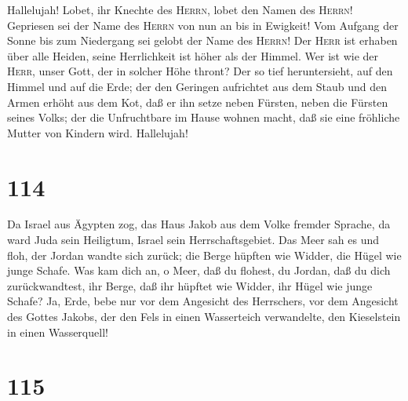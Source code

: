  Hallelujah! Lobet, ihr Knechte des \textsc{Herrn}, lobet
den Namen des \textsc{Herrn}!  Gepriesen sei der Name des
\textsc{Herrn} von nun an bis in Ewigkeit!  Vom Aufgang
der Sonne bis zum Niedergang sei gelobt der Name des \textsc{Herrn}!
 Der \textsc{Herr} ist erhaben über alle Heiden, seine
Herrlichkeit ist höher als der Himmel.  Wer ist wie der
\textsc{Herr}, unser Gott, der in solcher Höhe thront? 
Der so tief heruntersieht, auf den Himmel und auf die Erde;
 der den Geringen aufrichtet aus dem Staub und den Armen
erhöht aus dem Kot,  daß er ihn setze neben Fürsten, neben
die Fürsten seines Volks;  der die Unfruchtbare im Hause
wohnen macht, daß sie eine fröhliche Mutter von Kindern wird.
Hallelujah!

\hypertarget{section-113}{%
\section{114}\label{section-113}}

 Da Israel aus Ägypten zog, das Haus Jakob aus dem Volke
fremder Sprache,  da ward Juda sein Heiligtum, Israel sein
Herrschaftsgebiet.  Das Meer sah es und floh, der Jordan
wandte sich zurück;  die Berge hüpften wie Widder, die
Hügel wie junge Schafe.  Was kam dich an, o Meer, daß du
flohest, du Jordan, daß du dich zurückwandtest,  ihr
Berge, daß ihr hüpftet wie Widder, ihr Hügel wie junge Schafe?
 Ja, Erde, bebe nur vor dem Angesicht des Herrschers, vor
dem Angesicht des Gottes Jakobs,  der den Fels in einen
Wasserteich verwandelte, den Kieselstein in einen Wasserquell!

\hypertarget{section-114}{%
\section{115}\label{section-114}}

